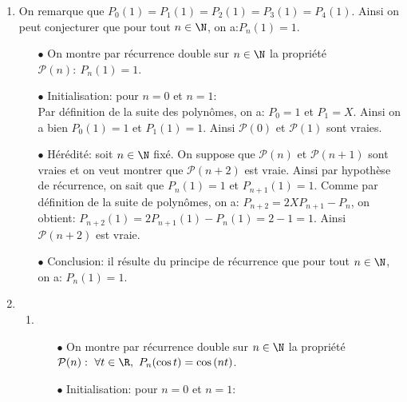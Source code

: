 \documentclass[a4paper, 11pt,reqno]{article}
\begin{document}
\begin{correction}
\begin{enumerate}
\begin{itemize}
			            $$P_{n+2}=2X(2^{n}X^{n+1}+S)-2^{n-1}X^{n}-T=2^{n+1}X^{n+2}+2XS-2^{n-1}X^n-T=2^{n+1}X^{n+2}+R$$
			            avec $R=2XS-2^{n-1}X^n-T\in \R_{n+1}\lbrack X\rbrack$ par propri\'et\'es sur le degr\'e de produits et de sommes de polyn\^{o}mes. Ainsi $\mathcal{P}(n+2)$ est vraie.
			      \item[$\bullet$] Conclusion: il r\'esulte du principe de r\'ecurrence que pour tout $n\in\N^{\star}$, on a: $\deg{P_n}=n$ et le coefficient dominant de $P_n$ est $2^{n-1}$.
		      \end{itemize}
		\item On remarque que $P_0(1)=P_1(1)=P_2(1)=P_3(1)=P_4(1)$. Ainsi on peut conjecturer que pour tout $n\in\N$, on a:$P_n(1)=1$.
		      \begin{itemize}
			      \item[$\bullet$] On montre par r\'ecurrence double sur $n\in\N$ la propri\'et\'e $\mathcal{P}(n):\ P_n(1)=1$.
			      \item[$\bullet$] Initialisation: pour $n=0$ et $n=1$:\\
			            \noindent Par d\'efinition de la suite des polyn\^{o}mes, on a: $P_0=1$ et $P_1=X$. Ainsi on a bien $P_0(1)=1$ et $P_1(1)=1$. Ainsi $\mathcal{P}(0)$ et $\mathcal{P}(1)$ sont vraies.
			      \item[$\bullet$] H\'er\'edit\'e: soit $n\in\N$ fix\'e. On suppose que $\mathcal{P}(n)$ et $\mathcal{P}(n+1)$ sont vraies et on veut montrer que $\mathcal{P}(n+2)$ est vraie. Ainsi par hypoth\`{e}se de r\'ecurrence, on sait que $P_n(1)=1$ et $P_{n+1}(1)=1$. Comme par d\'efinition de la suite de polyn\^{o}mes, on a: $P_{n+2}=2XP_{n+1}-P_n$, on obtient:
			            $P_{n+2}(1)=2P_{n+1}(1)-P_n(1)=2-1=1$. Ainsi $\mathcal{P}(n+2)$ est vraie.
			      \item[$\bullet$] Conclusion: il r\'esulte du principe de r\'ecurrence que pour tout $n\in\N$, on a: $P_n(1)=1$.
		      \end{itemize}
		\item
		      \begin{enumerate}
			      \item
			            \begin{itemize}
				            \item[$\bullet$] On montre par r\'ecurrence double sur $n\in\N$ la propri\'et\'e $\mathcal{P}(n):\ \forall t\in\R,\ P_n(\cos{t})=\cos{(nt)}$.
				            \item[$\bullet$] Initialisation: pour $n=0$ et $n=1$:\\

\end{itemize}
\end{enumerate}
\end{enumerate}
\end{correction}
\end{document}
